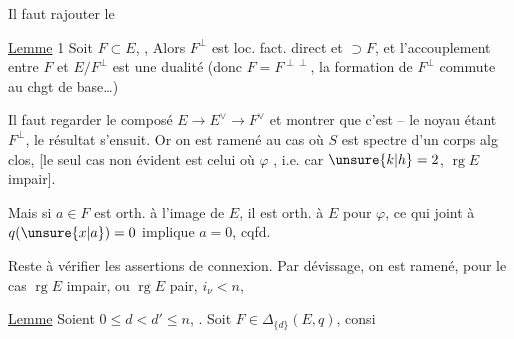 
Il faut rajouter le

\uline{Lemme} 1 Soit $F\subset E$, , Alors $F^\perp$ est loc. fact. direct et $\supset F$, et l'accouplement entre $F$ et $E/F^\perp$ est une dualité (donc $F=F^{\perp\perp}$, la formation de $F^\perp$ commute au chgt de base\ldots)

Il faut regarder  le composé $E\longrightarrow E^\vee\longrightarrow F^\vee$ et montrer que c'est  -- le noyau étant $F^\perp$, le résultat s'ensuit. Or on est ramené au cas où $S$ est spectre d'un corps alg clos, [le seul cas non évident est celui où $\varphi$ , i.e. car $\unsure{k|h}=2$, $\operatorname{rg} E$ impair].

Mais  si $a\in F$ est orth. à l'image de $E$, il est orth. à $E$ pour $\varphi$,  ce qui joint à $q(\unsure{x|a})=0$ implique $a=0$, cqfd.

Reste à vérifier les assertions de connexion. Par dévissage, on est ramené, pour le cas  $\operatorname{rg}E$ impair, ou $\operatorname{rg}E$ pair, $i_\nu<n$, 


\uline{Lemme}  Soient $0\leq d<d'\leq n$,  . Soit $F\in\Delta_{\{d\}}(E,q)$, consi%
